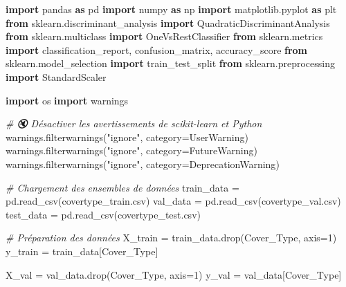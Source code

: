 \documentclass[
  letterpaper,
  DIV=11,
  numbers=noendperiod]{scrartcl}
\newenvironment{Shaded}{}{}
\newcommand{\CommentTok}[1]{\textcolor[rgb]{0.38,0.63,0.69}{\textit{#1}}}
\newcommand{\DecValTok}[1]{\textcolor[rgb]{0.25,0.63,0.44}{#1}}
\newcommand{\ImportTok}[1]{\textcolor[rgb]{0.00,0.50,0.00}{\textbf{#1}}}
\newcommand{\NormalTok}[1]{#1}
\newcommand{\OperatorTok}[1]{\textcolor[rgb]{0.40,0.40,0.40}{#1}}
\newcommand{\PreprocessorTok}[1]{\textcolor[rgb]{0.74,0.48,0.00}{#1}}
\newcommand{\StringTok}[1]{\textcolor[rgb]{0.25,0.44,0.63}{#1}}
\begin{document}
\begin{Shaded}
\begin{Highlighting}[]
\ImportTok{import}\NormalTok{ pandas }\ImportTok{as}\NormalTok{ pd}
\ImportTok{import}\NormalTok{ numpy }\ImportTok{as}\NormalTok{ np}
\ImportTok{import}\NormalTok{ matplotlib.pyplot }\ImportTok{as}\NormalTok{ plt}
\ImportTok{from}\NormalTok{ sklearn.discriminant\_analysis }\ImportTok{import}\NormalTok{ QuadraticDiscriminantAnalysis}
\ImportTok{from}\NormalTok{ sklearn.multiclass }\ImportTok{import}\NormalTok{ OneVsRestClassifier}
\ImportTok{from}\NormalTok{ sklearn.metrics }\ImportTok{import}\NormalTok{ classification\_report, confusion\_matrix, accuracy\_score}
\ImportTok{from}\NormalTok{ sklearn.model\_selection }\ImportTok{import}\NormalTok{ train\_test\_split}
\ImportTok{from}\NormalTok{ sklearn.preprocessing }\ImportTok{import}\NormalTok{ StandardScaler}

\ImportTok{import}\NormalTok{ os}
\ImportTok{import}\NormalTok{ warnings}

\CommentTok{\# 🔇 Désactiver les avertissements de scikit{-}learn et Python}
\NormalTok{warnings.filterwarnings(}\StringTok{"ignore"}\NormalTok{, category}\OperatorTok{=}\PreprocessorTok{UserWarning}\NormalTok{)}
\NormalTok{warnings.filterwarnings(}\StringTok{"ignore"}\NormalTok{, category}\OperatorTok{=}\PreprocessorTok{FutureWarning}\NormalTok{)}
\NormalTok{warnings.filterwarnings(}\StringTok{"ignore"}\NormalTok{, category}\OperatorTok{=}\PreprocessorTok{DeprecationWarning}\NormalTok{)}

\CommentTok{\# Chargement des ensembles de données}
\NormalTok{train\_data }\OperatorTok{=}\NormalTok{ pd.read\_csv(}\StringTok{\textquotesingle{}covertype\_train.csv\textquotesingle{}}\NormalTok{)}
\NormalTok{val\_data }\OperatorTok{=}\NormalTok{ pd.read\_csv(}\StringTok{\textquotesingle{}covertype\_val.csv\textquotesingle{}}\NormalTok{)}
\NormalTok{test\_data }\OperatorTok{=}\NormalTok{ pd.read\_csv(}\StringTok{\textquotesingle{}covertype\_test.csv\textquotesingle{}}\NormalTok{)}

\CommentTok{\# Préparation des données}
\NormalTok{X\_train }\OperatorTok{=}\NormalTok{ train\_data.drop(}\StringTok{\textquotesingle{}Cover\_Type\textquotesingle{}}\NormalTok{, axis}\OperatorTok{=}\DecValTok{1}\NormalTok{)}
\NormalTok{y\_train }\OperatorTok{=}\NormalTok{ train\_data[}\StringTok{\textquotesingle{}Cover\_Type\textquotesingle{}}\NormalTok{]}

\NormalTok{X\_val }\OperatorTok{=}\NormalTok{ val\_data.drop(}\StringTok{\textquotesingle{}Cover\_Type\textquotesingle{}}\NormalTok{, axis}\OperatorTok{=}\DecValTok{1}\NormalTok{)}
\NormalTok{y\_val }\OperatorTok{=}\NormalTok{ val\_data[}\StringTok{\textquotesingle{}Cover\_Type\textquotesingle{}}\NormalTok{]}


\end{Highlighting}
\end{Shaded}
\end{document}
